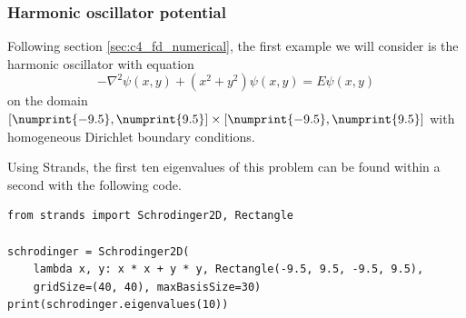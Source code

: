 \subsubsection{Harmonic oscillator potential}\label{sec:c4_numerical_harmonic}

Following section \ref{sec:c4_fd_numerical}, the first example we will consider is the harmonic oscillator with equation
\begin{equation}\label{equ:c4_nm_harmonic}
    -\nabla^2 \psi(x, y) + \left(x^2 + y^2\right) \psi(x, y) = E \psi(x, y)
\end{equation}
on the domain $[\numprint{-9.5}, \numprint{9.5}] \times [\numprint{-9.5}, \numprint{9.5}]$ with homogeneous Dirichlet boundary conditions.

Using Strands, the first ten eigenvalues of this problem can be found within a second with the following code.
\begin{verbatim}
from strands import Schrodinger2D, Rectangle

schrodinger = Schrodinger2D(
    lambda x, y: x * x + y * y, Rectangle(-9.5, 9.5, -9.5, 9.5),
    gridSize=(40, 40), maxBasisSize=30)
print(schrodinger.eigenvalues(10))
\end{verbatim}


